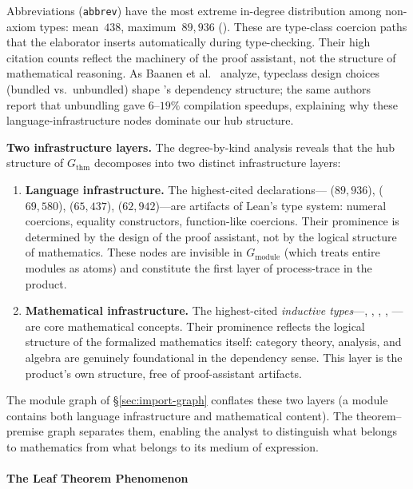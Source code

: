 Abbreviations (\texttt{abbrev}) have the most extreme in-degree distribution among non-axiom types: mean~$438$, maximum~$89{,}936$ (). These are type-class coercion paths that the elaborator inserts automatically during type-checking. Their high citation counts reflect the machinery of the proof assistant, not the structure of mathematical reasoning. As Baanen et al.~\cite{baanen2022} analyze, typeclass design choices (bundled vs.\ unbundled) shape 's dependency structure; the same authors~\cite{baanen2025} report that unbundling gave $6$--$19\%$ compilation speedups, explaining why these language-infrastructure nodes dominate our hub structure.

\noindent\textbf{Two infrastructure layers.}
\label{rem:two-layers}
The degree-by-kind analysis reveals that the hub structure of $G_{\mathrm{thm}}$ decomposes into two distinct infrastructure layers:
\begin{enumerate}
\item \textbf{Language infrastructure.} The highest-cited declarations--- ($89{,}936$),  ($69{,}580$),  ($65{,}437$),  ($62{,}942$)---are artifacts of Lean's type system: numeral coercions, equality constructors, function-like coercions. Their prominence is determined by the design of the proof assistant, not by the logical structure of mathematics. These nodes are invisible in $G_{\mathrm{module}}$ (which treats entire modules as atoms) and constitute the first layer of process-trace in the product.

\item \textbf{Mathematical infrastructure.} The highest-cited \emph{inductive types}---, , , , ---are core mathematical concepts. Their prominence reflects the logical structure of the formalized mathematics itself: category theory, analysis, and algebra are genuinely foundational in the dependency sense. This layer is the product's own structure, free of proof-assistant artifacts.
\end{enumerate}
The module graph of \S\ref{sec:import-graph} conflates these two layers (a module contains both language infrastructure and mathematical content). The theorem--premise graph separates them, enabling the analyst to distinguish what belongs to mathematics from what belongs to its medium of expression.

\paragraph{The Leaf Theorem Phenomenon}
\label{sec:thm-leaves}

